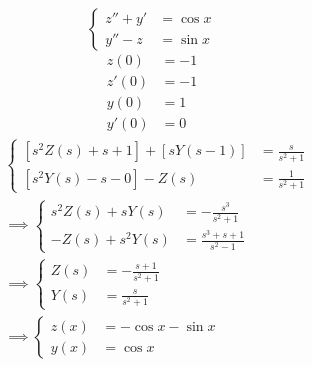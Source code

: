 \documentclass[11pt,a4paper,titlepage,final]{article}
\begin{document}
\begin{exercise*}{12.16}
	\[
	\begin{cases}
	z''+y'&=\cos x \\
	y''-z&=\sin x
	\end{cases}
	\]
	\begin{align*}
	z(0) &= -1\\
	z'(0) &= -1 \\
	y(0) &= 1 \\
	y'(0) &= 0
	\end{align*}
	\tcblower
	\begin{align*}
	& \begin{cases}
	\left[s^2Z(s)+s+1\right]+\left[sY(s-1)\right] &= \frac{s}{s^2+1} \\
	\left[s^2Y(s)-s-0\right]-Z(s) &= \frac{1}{s^2+1}
	\end{cases} \\ &\implies
	\begin{cases}
	s^2Z(s)+sY(s) &= -\frac{s^3}{s^2+1} \\
	-Z(s)+s^2Y(s) &= \frac{s^3+s+1}{s^2-1}
	\end{cases} \\
	& \implies \begin{cases}
	Z(s) &= -\frac{s+1}{s^2+1} \\
	Y(s) &= \frac{s}{s^2+1}
	\end{cases} \\
	& \implies \begin{cases}
	z(x) &= -\cos x-\sin x \\
	y(x) &= \cos x
	\end{cases}
	\end{align*}
\end{exercise*}
\end{document}
